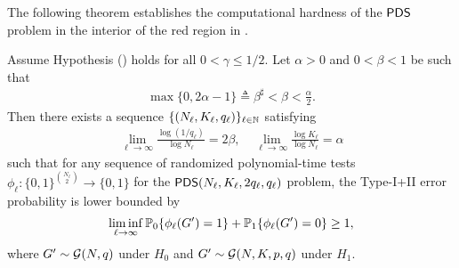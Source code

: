 	
The following theorem establishes the computational hardness of the ${\sf PDS}$ problem in the interior of the red region in . 
\begin{theorem}
\label{thm:pds}
   Assume \PC Hypothesis () holds for all $0<\gamma \le 1/2$.  
Let $ \alpha>0$ and $0<\beta<1$ be such that
\begin{align}
  \max \{ 0, 2\alpha-1 \} \triangleq \beta^{\sharp} <\beta < \frac{\alpha}{2}.
  \label{eq:computationallimit}
    \end{align}
    Then there exists a sequence $\{(N_\ell,K_\ell,q_\ell)\}_{\ell \in {\mathbb{N}}}$ satisfying
    \begin{align*}
     \lim_{\ell \to \infty} \frac{\log (1/q_\ell)  }{ \log N_\ell} =2\beta , \quad  \lim_{\ell \to \infty}  \frac{\log K_\ell}{ \log N_\ell}= \alpha
    \end{align*}
    such that for any sequence of randomized polynomial-time tests $\phi_{\ell}: \{0,1\}^{\binom{N_\ell}{2} } \to \{0,1\}$ for the ${\sf PDS}(N_\ell,K_\ell,2q_\ell,q_\ell)$ problem, the Type-I+II error probability is lower bounded by
    \begin{align*}
\liminf_{\ell \to \infty} \mathbb{P}_0\{ \phi_\ell(G')=1\}+ \mathbb{P}_1 \{ \phi_\ell(G')=0 \} \geq 1,
\end{align*}
where $G' \sim {\mathcal{G}}(N,q)$ under $H_0$ and $G' \sim {\mathcal{G}}(N,K,p,q)$ under $H_1$.
\end{theorem}
	
